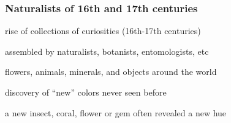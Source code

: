 \documentclass[12pt]{beamer}\usepackage[]{graphicx}\usepackage[]{color}
\begin{document}
{ %
    \begin{frame}[plain]
     \end{frame}
}


\begin{frame}
\frametitle{Naturalists of 16th and 17th centuries}

\bbi
  \item rise of collections of curiosities (16th-17th centuries)
  \item assembled by naturalists, botanists, entomologists, etc
  \item flowers, animals, minerals, and objects around the world
  \item discovery of ``new'' colors never seen before
  \item a new insect, coral, flower or gem often revealed a new hue
\ei

\end{frame}

\end{document}
